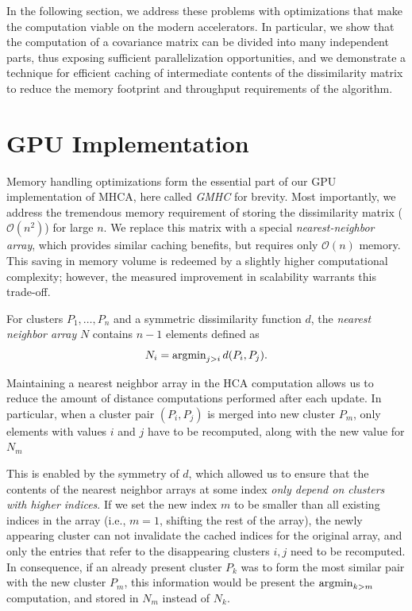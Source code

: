 In the following section, we address these problems with optimizations that make the computation viable on the modern accelerators.
In particular, we show that the computation of a covariance matrix can be divided into many independent parts, thus exposing sufficient parallelization opportunities, and we demonstrate a technique for efficient caching of intermediate contents of the dissimilarity matrix to reduce the memory footprint and throughput requirements of the algorithm.

\section{GPU Implementation}\label{sec:maha_implementation}

Memory handling optimizations form the essential part of our GPU implementation of MHCA, here called \emph{GMHC} for brevity.
Most importantly, we address the tremendous memory requirement of storing the dissimilarity matrix ($\mathcal{O}(n^2)$) for large $n$.
We replace this matrix with a special \emph{nearest-neighbor array}, which provides similar caching benefits, but requires only $\mathcal{O}(n)$ memory.
This saving in memory volume is redeemed by a slightly higher computational complexity; however, the measured improvement in scalability warrants this trade-off.

\begin{defn}
	For clusters $P_1,\dots,P_n$ and a symmetric dissimilarity function $d$, the \emph{nearest neighbor array} $N$ contains $n-1$ elements defined as
	\[N_i = \operatorname{argmin}_{j>i} d(P_i,P_j).\]
	\label{def:nna}
\end{defn}


Maintaining a nearest neighbor array in the HCA computation allows us to reduce the amount of distance computations performed after each update.
In particular, when a cluster pair $(P_i,P_j)$ is merged into new cluster $P_m$, only elements with values $i$ and $j$ have to be recomputed, along with the new value for $N_m$

This is enabled by the symmetry of $d$, which allowed us to ensure that the contents of the nearest neighbor arrays at some index \emph{only depend on clusters with higher indices}.
If we set the new index $m$ to be smaller than all existing indices in the array (i.e., $m=1$, shifting the rest of the array), the newly appearing cluster can not invalidate the cached indices for the original array, and only the entries that refer to the disappearing clusters $i,j$ need to be recomputed.
In consequence, if an already present cluster $P_k$ was to form the most similar pair with the new cluster $P_m$, this information would be present the $\operatorname{argmin}_{k>m}$ computation, and stored in $N_m$ instead of $N_k$.

